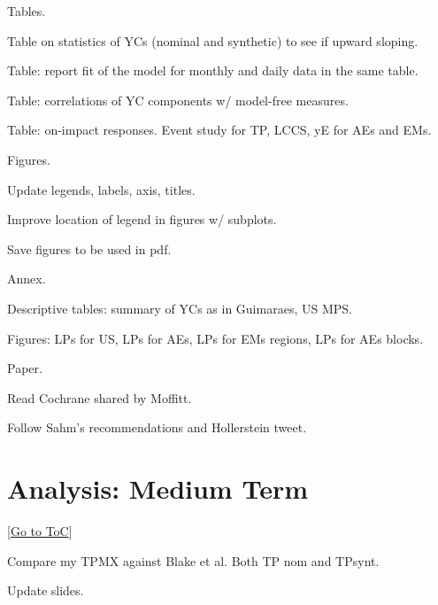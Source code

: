\documentclass[12pt]{article}
\newcommand{\gototoc}{\vspace{-1.8cm} \null\hfill [\hyperlink{toc}{Go to ToC}] \newline}
\begin{document}
\begin{todolist}
	\item Tables.
	\begin{todolist}
		\item Table on statistics of YCs (nominal and synthetic) to see if upward sloping.
		\item Table: report fit of the model for monthly and daily data in the same table.
		\item Table: correlations of YC components w/ model-free measures.
		\item Table: on-impact responses. Event study for TP, LCCS, yE for AEs and EMs.
	\end{todolist}
	
	\item Figures.
	\begin{todolist}
		\item Update legends, labels, axis, titles.
		\item Improve location of legend in figures w/ subplots.
		\item Save figures to be used in pdf.
	\end{todolist}

	\item Annex.
	\begin{todolist}
		\item Descriptive tables: summary of YCs as in Guimaraes, US MPS.
		\item Figures: LPs for US, LPs for AEs, LPs for EMs regions, LPs for AEs blocks.
	\end{todolist}
	
	\item Paper.
	\begin{todolist}
		\item Read Cochrane shared by Moffitt.
		\item Follow Sahm's recommendations and Hollerstein tweet.
	\end{todolist}
	
\end{todolist}

\section{Analysis: Medium Term}
\gototoc
\begin{todolist}
	\item Compare my TPMX against Blake et al. Both TP nom and TPsynt.
	\item Update slides.
\end{todolist}
\end{document}

